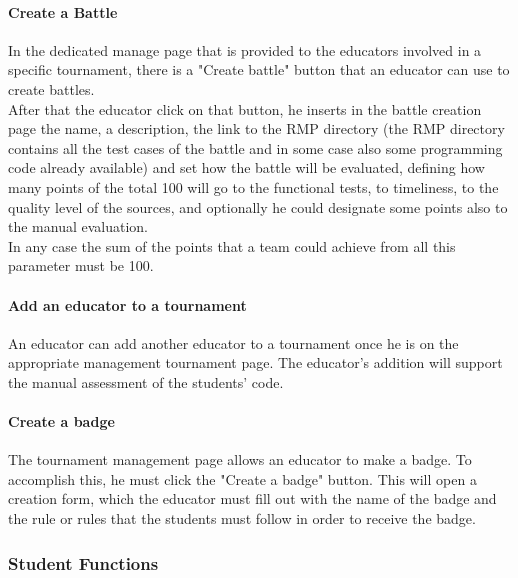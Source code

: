 \paragraph{Create a Battle}
In the dedicated manage page that is provided to the educators involved in a specific tournament, there is a "Create battle" button that an educator can use to create battles.\\
After that the educator click on that button, he inserts in the battle creation page the name, a description, the link to the RMP directory (the RMP directory contains all the test cases of the battle
and in some case also some programming code already available) and set how the battle will be evaluated, defining how many points of the total 100 will go to the functional tests, to timeliness, to 
the quality level of the sources, and optionally he could designate some points also to the manual evaluation.\\
In any case the sum of the points that a team could achieve from all this parameter must be 100.

\paragraph{Add an educator to a tournament}
An educator can add another educator to a tournament once he is on the appropriate management tournament page. The educator's addition will support the manual assessment of the students' code.

\paragraph{Create a badge}
The tournament management page allows an educator to make a badge. To accomplish this, he must click the "Create a badge" button. This will open a creation form, which the educator must fill out with the name of the badge and the rule 
or rules that the students must follow in order to receive the badge.

\subsubsection{Student Functions}

